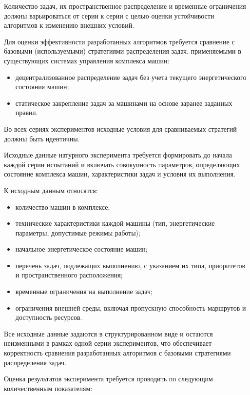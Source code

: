 Количество задач, их пространственное распределение и временные ограничения должны варьироваться от серии к серии с целью оценки устойчивости алгоритмов к изменению внешних условий.

Для оценки эффективности разработанных алгоритмов требуется сравнение с базовыми (используемыми) стратегиями распределения задач, применяемыми в существующих системах управления комплекса машин:
\begin{itemize}[beginpenalty=10000, midpenalty=10000, wide=\parindent, leftmargin=0pt]
	\item децентрализованное распределение задач без учета текущего энергетического состояния машин;
	\item статическое закрепление задач за машинами на основе заранее заданных правил.
\end{itemize}

Во всех сериях экспериментов исходные условия для сравниваемых стратегий должны быть идентичны.

Исходные данные натурного эксперимента требуется формировать до начала каждой серии испытаний и включать совокупность параметров, определяющих состояние комплекса машин, характеристики задач и условия их выполнения.

К исходным данным относятся:
\begin{itemize}[beginpenalty=10000, midpenalty=10000, wide=\parindent, leftmargin=0pt]
	\item количество машин в комплексе;
	\item технические характеристики каждой машины (тип, энергетические параметры, допустимые режимы работы);
	\item начальное энергетическое состояние машин;
	\item перечень задач, подлежащих выполнению, с указанием их типа, приоритетов и пространственного расположения;
	\item временные ограничения на выполнение задач;
	\item ограничения внешней среды, включая пропускную способность маршрутов и доступность ресурсов.
\end{itemize}

Все исходные данные задаются в структурированном виде и остаются неизменными в рамках одной серии экспериментов, что обеспечивает корректность сравнения разработанных алгоритмов с базовыми стратегиями распределения задач.

Оценка результатов эксперимента требуется проводить по следующим количественным показателям:

